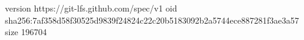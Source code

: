 version https://git-lfs.github.com/spec/v1
oid sha256:7af358d58f30525d9839f24824c22c20b5183092b2a5744ece887281f3ae3a57
size 196704
